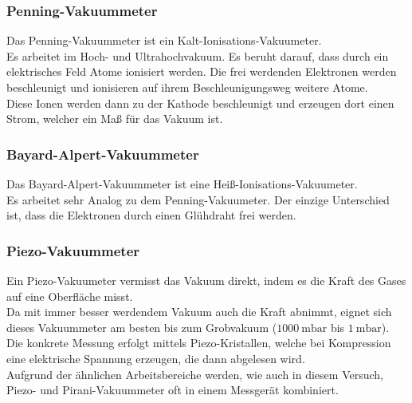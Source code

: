 		\subsubsection{Penning-Vakuummeter}

			\noindent
			Das Penning-Vakuummeter ist ein Kalt-Ionisations-Vakuumeter.\\
			Es arbeitet im Hoch- und Ultrahochvakuum. 
			Es beruht darauf, dass durch ein elektrisches Feld Atome ionisiert werden.
			Die frei werdenden Elektronen werden beschleunigt und ionisieren auf ihrem Beschleunigungsweg weitere Atome.\\
			Diese Ionen werden dann zu der Kathode beschleunigt und erzeugen dort einen Strom, welcher ein Maß für das Vakuum ist.

		\subsubsection{Bayard-Alpert-Vakuummeter}

			\noindent
			Das Bayard-Alpert-Vakuummeter ist eine Heiß-Ionisations-Vakuumeter.\\ Es arbeitet sehr Analog zu dem Penning-Vakuumeter.
			Der einzige Unterschied ist, dass die Elektronen durch einen Glühdraht frei werden.
		
		\subsubsection{Piezo-Vakuummeter}
			
			\noindent
			Ein Piezo-Vakuumeter vermisst das Vakuum direkt, indem es die Kraft des Gases auf eine Oberfläche misst. \\
			Da mit immer besser werdendem Vakuum auch die Kraft abnimmt, eignet sich dieses Vakuummeter am besten bis zum Grobvakuum ($\SI{1000}{\milli\bar}$ bis $\SI{1}{\milli\bar}$).\\
			Die konkrete Messung erfolgt mittels Piezo-Kristallen, welche bei Kompression eine elektrische Spannung erzeugen, die dann abgelesen wird.\\
			Aufgrund der ähnlichen Arbeitsbereiche werden, wie auch in diesem Versuch, Piezo- und Pirani-Vakuummeter oft in einem Messgerät kombiniert.

			\newpage
